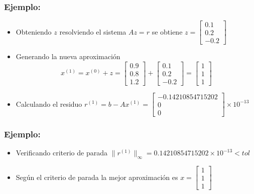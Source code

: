 \documentclass{beamer}
\begin{document}
  \begin{frame}
    \frametitle{Ejemplo:}
    \begin{itemize}
      \item Obteniendo $z$ resolviendo el sistema $Az = r$ se obtiene $z =\left[\begin{array}{c}
        0.1\\
        0.2\\
        -0.2
      \end{array}\right]$
      \item<2->Generando la nueva aproximaci\'on
      $$
      x^{(1)} = x^{(0)} + z = \left[\begin{array}{c}
        0.9\\
        0.8\\
        1.2
      \end{array}\right] + \left[\begin{array}{c}
        0.1\\
        0.2\\
        -0.2
      \end{array}\right] = \left[\begin{array}{c}
        1\\
        1\\
        1
      \end{array}\right]
      $$
      \item<3-> Calculando el residuo $r^{(1)} = b - Ax^{(1)} = \left[\begin{array}{c}
        -0.14210854715202\\
        0\\
        0
      \end{array}\right]\times 10^{-13}$
    \end{itemize}
  \end{frame}
  \begin{frame}
    \frametitle{Ejemplo:}
    \begin{itemize}
      \item Verificando criterio de parada $\|r^{(1)}\|_{\infty} = 0.14210854715202\times 10^{-13} < tol$
      \item<2->Seg\'un el criterio de parada la mejor aproximaci\'on es $x=\left[\begin{array}{c}
        1\\
        1\\
        1
      \end{array}\right]$
    \end{itemize}
  \end{frame}
\end{document}

